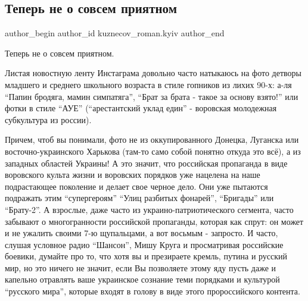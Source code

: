  
 
 
 
 
 
\subsection{Теперь не о совсем приятном}
\label{sec:22_11_2021.fb.kuznecov_roman.kyiv.1.ne_o_sovsem_prijatnom}
 
\ifcmt
 author_begin
   author_id kuznecov_roman.kyiv
 author_end
\fi

Теперь не о совсем приятном.

Листая новостную ленту Инстаграма довольно часто натыкаюсь на фото детворы
младшего и среднего школьного возраста в стиле гопников из лихих 90-х: а-ля
\enquote{Папин бродяга, мамин симпатяга}, \enquote{Брат за брата - такое за основу взято!} или
фотки в стиле \enquote{АУЕ} (\enquote{арестантский уклад един} - воровская молодежная
субкультура из россии).


Причем, чтоб вы понимали, фото не из оккупированного Донецка, Луганска или
восточно-украинского Харькова (там-то само собой понятно откуда это всё), а из
западных областей Украины! А это значит, что российская пропаганда в виде
воровского культа жизни и воровских порядков уже нацелена на наше подрастающее
поколение и делает свое черное дело. Они уже пытаются подражать этим
\enquote{супергероям} \enquote{Улиц разбитых фонарей}, \enquote{Бригады} или
\enquote{Брату-2}. А взрослые, даже часто из украино-патриотического сегмента,
часто забывают о многогранности российской пропаганды, которая как спрут: он
может и не ужалить своими 7-ю щупальцами, а вот восьмым - запросто. И часто,
слушая условное радио \enquote{Шансон}, Мишу Круга и просматривая российские
боевики, думайте про то, что хотя вы и презираете кремль, путина и русский мир,
но это ничего не значит, если Вы позволяете этому яду пусть даже и капельно
отравлять ваше украинское сознание теми порядками и культурой \enquote{русского
мира}, которые входят в голову в виде этого пророссийского контента. 

